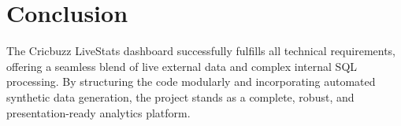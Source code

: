 \documentclass[11pt, a4paper]{article}
\begin{document}
	\section{Conclusion}
	The Cricbuzz LiveStats dashboard successfully fulfills all technical requirements, offering a seamless blend of live external data and complex internal SQL processing. By structuring the code modularly and incorporating automated synthetic data generation, the project stands as a complete, robust, and presentation-ready analytics platform.
	
\end{document}
